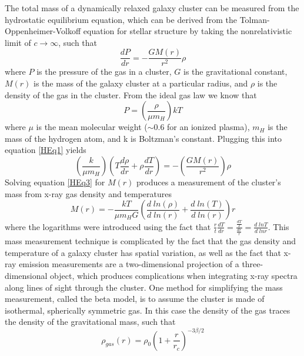 \documentclass[a4paper,12pt]{article}
\begin{document}
The total mass of a dynamically relaxed galaxy cluster can be measured from the hydrostatic equilibrium equation, which can be derived from the Tolman-Oppenheimer-Volkoff equation for stellar structure by taking the nonrelativistic  limit of $c \rightarrow \infty$, such that 
\begin{equation} \label{HEq1}
\frac{dP}{dr} = -\frac{GM(r)}{r^2}\rho
\end{equation}
where $P$ is the pressure of the gas in a cluster, $G$ is the gravitational constant, $M(r)$ is the mass of the galaxy cluster at a particular radius, and $\rho$ is the density of the gas in the cluster.  From the ideal gas law we know that
\begin{equation} \label{HEq2}
P=(\frac{\rho}{\mu m_H})kT
\end{equation}
where $\mu$ is the mean molecular weight ($\sim$0.6 for an ionized plasma), $m_H$ is the mass of the hydrogen atom, and k is Boltzman's constant.  Plugging this into equation \ref{HEq1} yields
\begin{equation} \label{HEq3}
(\frac{k}{\mu m_H})(T\frac{d\rho}{dr} + \rho\frac{dT}{dr})=-(\frac{GM(r)}{r^2})\rho
\end{equation}
Solving equation \ref{HEq3} for $M(r)$ produces a measurement of the cluster's mass from x-ray gas density and temperatures
\begin{equation} \label{HEq4}
M(r) = -\frac{kT}{\mu m_H G}(\frac{d \; ln(\rho)}{d \; ln(r)} + \frac{d \; ln(T)}{d \; ln(r)})r
\end{equation}
where the logarithms were introduced using the fact that $\frac{r}{t}\frac{dT}{dr}=\frac{\frac{dT}{T}}{\frac{dr}{r}}=\frac{ d \; ln{T}}{d \; ln{r} }$. 
This mass measurement technique is complicated by the fact that the gas density and temperature of a galaxy cluster has spatial variation, as well as the fact that x-ray emission measurements are a two-dimensional projection of a three-dimensional object, which  produces complications when integrating x-ray spectra along lines of sight through the cluster. One method for simplifying the mass measurement, called the beta model, is to assume the cluster is made of isothermal, spherically symmetric gas.  In this case the density of the gas traces the density of the gravitational mass, such that
\begin{equation} \label{HBeta1}
\rho_{gas}(r) = \rho_0(1 + \frac{r}{r_c})^{-3\beta/2}
\end{equation}
\end{document}
